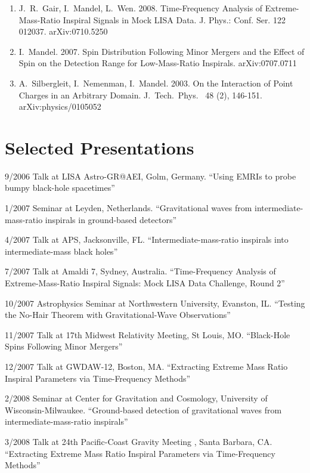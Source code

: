\documentclass[margin,line]{res}
\begin{document}
\begin{resume}
\begin{enumerate}
\item J.~R.~Gair, I.~Mandel, L.~Wen. 2008.  Time-Frequency Analysis of Extreme-Mass-Ratio Inspiral Signals in Mock LISA Data.   J. Phys.: Conf. Ser. 122 012037.  arXiv:0710.5250

\item I.~Mandel. 2007. Spin Distribution Following Minor Mergers and the Effect of Spin on the Detection Range for Low-Mass-Ratio Inspirals. arXiv:0707.0711

\item A.~Silbergleit, I.~Nemenman, I.~Mandel. 2003. On the Interaction of Point Charges in an Arbitrary Domain.  J.~Tech.~Phys.~ 48 (2), 146-151.  arXiv:physics/0105052

\end{enumerate}

\newpage
\section{\sc Selected Presentations}
9/2006 	 Talk  at LISA Astro-GR@AEI, Golm, Germany. 	 ``Using EMRIs to probe bumpy black-hole spacetimes''

1/2007 	Seminar at Leyden, Netherlands. 	``Gravitational waves from intermediate-mass-ratio inspirals in ground-based detectors''

4/2007 	Talk 	at APS, Jacksonville, FL. 	``Intermediate-mass-ratio inspirals into intermediate-mass black holes''

7/2007 	Talk 	at Amaldi 7, Sydney, Australia. 	``Time-Frequency Analysis of Extreme-Mass-Ratio Inspiral Signals: Mock LISA Data Challenge, Round 2''

10/2007 	Astrophysics Seminar at Northwestern University, Evanston, IL. 	``Testing the No-Hair Theorem with Gravitational-Wave Observations''

11/2007 	Talk 	at 17th Midwest Relativity Meeting, St Louis, MO. 	``Black-Hole Spins Following Minor Mergers''

12/2007 	Talk 	at GWDAW-12, Boston, MA. 	``Extracting Extreme Mass Ratio Inspiral Parameters via Time-Frequency Methods''

2/2008 	Seminar at Center for Gravitation and Cosmology, University of Wisconsin-Milwaukee. 	``Ground-based detection of gravitational waves from intermediate-mass-ratio inspirals''

3/2008 	Talk at 24th Pacific-Coast Gravity Meeting , Santa Barbara, CA. 	``Extracting Extreme Mass Ratio Inspiral Parameters via Time-Frequency Methods''


\end{resume}
\end{document}
